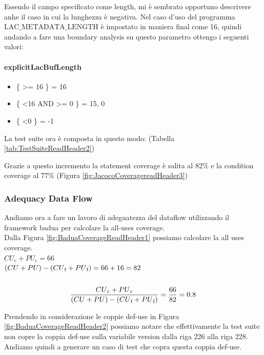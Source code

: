 \documentclass[12pt, a4paper]{article}
\begin{document}
Essendo il campo specificato come length, mi è sembrato opportuno descrivere anhe il caso in cui la lunghezza è negativa.
Nel caso d'uso del programma $\text{LAC\_METADATA\_LENGTH}$ è impostato in maniera final come 16, quindi andando a fare una boundary
analysis su questo parametro ottengo i seguenti valori:

\paragraph{explicitLacBufLength}
\begin{itemize}
  \item \{ \textgreater= 16 \} = 16
  \item \{ \textless 16 AND \textgreater= 0 \} = 15, 0
  \item \{ \textless 0 \} = -1
\end{itemize}

La test suite ora è composta in questo modo: (Tabella \ref{tab:TestSuiteReadHeader2})

Grazie a questo incremento la statement coverage è salita al 82\%
e la condition coverage al 77\% (Figura \ref{fig:JacocoCoveragereadHeader3})



\subsubsection{Adequacy Data Flow}

Andiamo ora a fare un lavoro di adeguatezza del dataflow utilizzando il framework badua per calcolare la all-uses coverage. \\
Dalla Figura \ref{fig:BaduaCoverageReadHeader1} possiamo calcolare la all uses coverage. \\

\(CU_c + PU_c = 66\) \\
\( (CU + PU) - (CU\textsubscript{f} + PU\textsubscript{f}) = 66 + 16 = 82\) \\ \\
\[\frac{{CU\textsubscript{c} + PU\textsubscript{c}}}{{(CU + PU) - (CU\textsubscript{f} + PU\textsubscript{f})}} = \frac{{66}}{{82}} = 0.8\]

Prendendo in considerazione le coppie def-use in Figura \ref{fig:BaduaCoverageReadHeader2} possiamo notare che
effettivamente la test suite non copre la coppia def-use sulla variabile version dalla riga 226 alla riga 228.
Andiamo quindi a generare un caso di test che copra questa coppia def-use. \\
\end{document}
